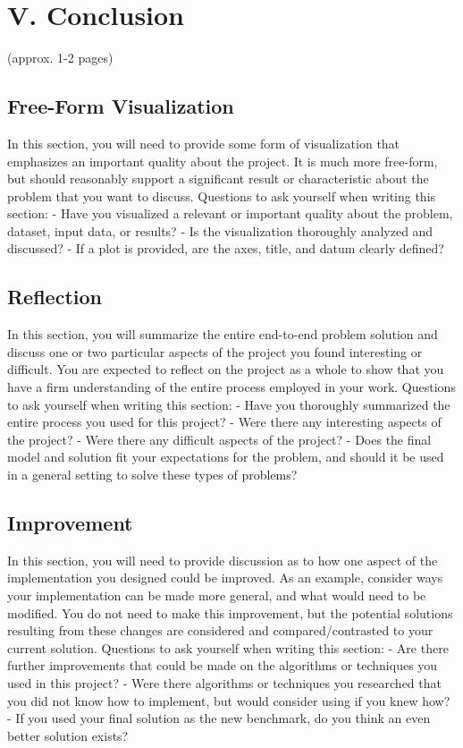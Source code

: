 \documentclass[12pt]{article}
\begin{document}
\section{V. Conclusion}
(approx. 1-2 pages)

\subsection{Free-Form Visualization}
In this section, you will need to provide some form of visualization that emphasizes an important quality about the project. It is much more free-form, but should reasonably support a significant result or characteristic about the problem that you want to discuss. Questions to ask yourself when writing this section:
- Have you visualized a relevant or important quality about the problem, dataset, input data, or results?
- Is the visualization thoroughly analyzed and discussed?
- If a plot is provided, are the axes, title, and datum clearly defined?

\subsection{Reflection}
In this section, you will summarize the entire end-to-end problem solution and discuss one or two particular aspects of the project you found interesting or difficult. You are expected to reflect on the project as a whole to show that you have a firm understanding of the entire process employed in your work. Questions to ask yourself when writing this section:
- Have you thoroughly summarized the entire process you used for this project?
- Were there any interesting aspects of the project?
- Were there any difficult aspects of the project?
- Does the final model and solution fit your expectations for the problem, and should it be used in a general setting to solve these types of problems?

\subsection{Improvement}
In this section, you will need to provide discussion as to how one aspect of the implementation you designed could be improved. As an example, consider ways your implementation can be made more general, and what would need to be modified. You do not need to make this improvement, but the potential solutions resulting from these changes are considered and compared/contrasted to your current solution. Questions to ask yourself when writing this section:
- Are there further improvements that could be made on the algorithms or techniques you used in this project?
- Were there algorithms or techniques you researched that you did not know how to implement, but would consider using if you knew how?
- If you used your final solution as the new benchmark, do you think an even better solution exists?
\end{document}

